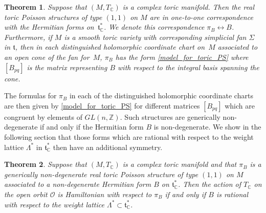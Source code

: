 \documentclass[10pt,a4paper]{amsart}
\numberwithin{equation}{section}
\newtheorem{Theorem}{Theorem}[section]
\begin{document}
\begin{Theorem}\label{1st_main_theorem}
Suppose that $(M,T_{\mathbb C})$ is a complex toric manifold. Then the real toric Poisson structures of type $(1,1)$ on $M$ are in one-to-one correspondence with the Hermitian forms on~${\mathfrak t}_{\mathbb C}^*$. We denote this correspondence $\pi_B\leftrightarrow B$. Furthermore, if $M$ is a smooth toric variety with corresponding simplicial fan $\Sigma$ in ${\mathfrak t}$, then in each distinguished holomorphic coordinate chart on~$M$ associated to an open cone of the fan for~$M$, $\pi_B$ has the form \eqref{model_for_toric_PS} where $[B_{pq}]$ is the matrix representing $B$ with respect to the integral basis spanning the cone.
\end{Theorem}

The formulas for $\pi_B$ in each of the distinguished holomorphic coordinate charts are then given by \eqref{model_for_toric_PS} for dif\/ferent matrices $[B_{pq}]$ which are congruent by elements of $GL(n,{\mathbb Z})$. Such structures are generically non-degenerate if and only if the Hermitian form $B$ is non-degenerate. We show in the following section that those forms which are rational with respect to the weight lattice $\Lambda^*$ in ${\mathfrak t}_{\mathbb C}^*$ then have an additional symmetry.

\begin{Theorem}\label{2nd_main_theorem}
Suppose that $(M,T_{\mathbb C})$ is a complex toric manifold and that $\pi_B$ is a generically non-degenerate real toric Poisson structure of type $(1,1)$ on $M$ associated to a non-degenerate Hermitian form $B$ on ${\mathfrak t}_{\mathbb C}^*$. Then the action of $T_{\mathbb C}$ on the open orbit $\mathcal O$ is Hamiltonian with respect to $\pi_B$ if and only if $B$ is rational with respect to the weight lattice $\Lambda^*\subset{\mathfrak t}_{\mathbb C}^*$.
\end{Theorem}
\end{document}
